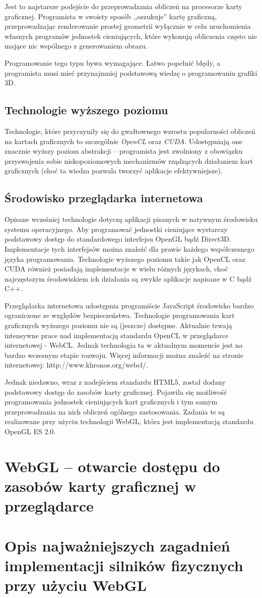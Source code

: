 Jest to najstarsze podejście do przeprowadzania obliczeń na procesorze karty
graficznej. Programista w swoisty sposób ,,oszukuje'' kartę graficzną,
przeprowadzając renderowanie prostej geometrii wyłącznie w celu uruchomienia
własnych programów jednostek cieniujących, które wykonują obliczenia często
nie mające nic wspólnego z generowaniem obrazu.

Programowanie tego typu bywa wymagające. Łatwo popełnić błędy, a programista
musi mieć przynajmniej podstawową wiedzę o programowaniu grafiki 3D.

\subsection{Technologie wyższego poziomu}

Technologie, które przyczyniły się do gwałtownego wzrostu popularności
obliczeń na kartach graficznych to szczególnie \emph{OpenCL} oraz \emph{CUDA}.
Udostępniają  one znacznie wyższy poziom abstrakcji -- programista jest
zwolniony z obowiązku przyswojenia sobie niskopoziomowych mechanizmów
rządzących działaniem kart graficznych (choć ta wiedza pozwala tworzyć
aplikacje efektywniejsze).

\subsection{Środowisko przeglądarka internetowa}

Opisane wcześniej technologie dotyczą aplikacji pisanych w natywnym środowisku
systemu operacyjnego. Aby programować jednostki cieniujące wystarczy
podstawowy dostęp do standardowego interfejsu OpenGL bądź Direct3D.
Implementacje tych interfejsów można znaleźć dla prawie każdego współczesnego
języka programowania. Technologie wyższego poziomu takie jak OpenCL oraz CUDA
również posiadają implementacje w wielu różnych językach, choć najczęstszym
środowiskiem ich działania są zwykle aplikacje napisane w C bądź C++.

Przeglądarka internetowa udostępnia programiście JavaScript środowisko bardzo
ograniczone ze względów bezpieczeństwa. Technologie programowania kart
graficznych wyższego poziomu nie są (jeszcze) dostępne. Aktualnie trwają
intensywne prace nad implementacją standardu OpenCL w przeglądarce
internetowej - WebCL. Jednak technologia ta w aktualnym momencie jest na
bardzo wczesnym etapie rozwoju. Więcej informacji można znaleźć na stronie
internetowej: http://www.khronos.org/webcl/.

Jednak niedawno, wraz z nadejściem standardu HTML5, został dodany podstawowy
dostęp do zasobów karty graficznej. Pojawiła się możliwość programowania
jednostek cieniujących kart graficznych i tym samym przeprowadzania na nich
obliczeń ogólnego zastosowania. Zadania te są realizowane przy użyciu
technologii WebGL, która jest implementacją standardu OpenGL ES 2.0.

\section{WebGL -- otwarcie dostępu do zasobów karty graficznej w przeglądarce}

\section{Opis najważniejszych zagadnień implementacji silników fizycznych przy użyciu WebGL}


